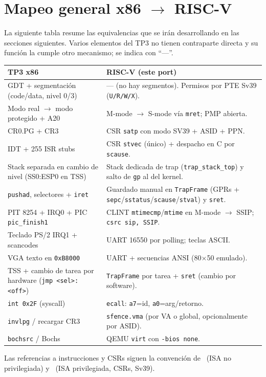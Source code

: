 \section{Mapeo general x86 $\to$ RISC-V}
\label{sec:mapeo}

La siguiente tabla resume las equivalencias que se irán desarrollando en las secciones siguientes. Varios elementos del
TP3 no tienen contraparte directa y su función la cumple otro mecanismo; se indica con ``---''.

\begin{center}
\small
\begin{tabular}{p{6.2cm} | p{8.6cm}}
\textbf{TP3 x86} & \textbf{RISC-V (este port)} \\
\hline
GDT + segmentación (code/data, nivel 0/3) & --- (no hay segmentos). Permisos por PTE Sv39 (\texttt{U/R/W/X}). \\
Modo real $\to$ modo protegido + A20 & M-mode $\to$ S-mode vía \texttt{mret}; PMP abierta. \\
CR0.PG + CR3 & CSR \texttt{satp} con modo SV39 + ASID + PPN. \\
IDT + 255 ISR stubs & CSR \texttt{stvec} (único) + despacho en C por \texttt{scause}. \\
Stack separada en cambio de nivel (SS0:ESP0 en TSS) & Stack dedicada de trap (\texttt{trap\_stack\_top}) y salto de
\texttt{gp} al del kernel. \\
\texttt{pushad}, selectores + \texttt{iret} & Guardado manual en \texttt{TrapFrame} (GPRs +
\texttt{sepc}/\texttt{sstatus}/\texttt{scause}/\texttt{stval}) y \texttt{sret}. \\
PIT 8254 + IRQ0 + PIC \texttt{pic\_finish1} & CLINT \texttt{mtimecmp}/\texttt{mtime} en M-mode $\to$ SSIP; \texttt{csrc
sip, SSIP}. \\
Teclado PS/2 IRQ1 + scancodes & UART 16550 por polling; teclas ASCII. \\
VGA texto en \texttt{0xB8000} & UART + secuencias ANSI (80$\times$50 emulado). \\
TSS + cambio de tarea por hardware (\texttt{jmp <sel>:<off>}) & \texttt{TrapFrame} por tarea + \texttt{sret} (cambio por
software). \\
\texttt{int 0x2F} (syscall) & \texttt{ecall}: \texttt{a7}=id, \texttt{a0}=arg/retorno. \\
\texttt{invlpg} / recargar CR3 & \texttt{sfence.vma} (por VA o global, opcionalmente por ASID). \\
\texttt{bochsrc} / Bochs & QEMU \texttt{virt} con \texttt{-bios none}. \\
\end{tabular}
\end{center}

Las referencias a instrucciones y CSRs siguen la convención de~\cite{riscv-unpriv} (ISA no privilegiada)
y~\cite{riscv-priv} (ISA privilegiada, CSRs, Sv39).
